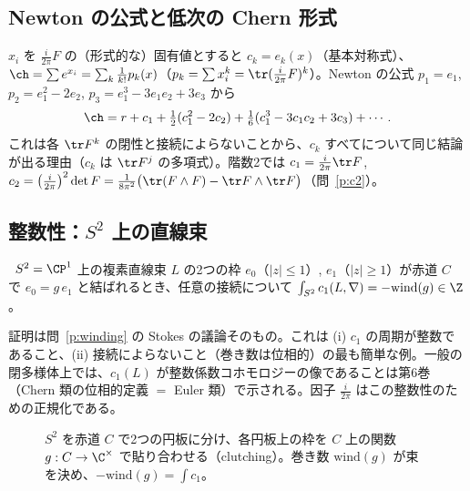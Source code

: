 \subsection{Newton の公式と低次の Chern 形式}
$x_i$ を $\frac i{2\pi}F$ の（形式的な）固有値とすると $c_k=e_k(x)$（基本対称式）、$\ch=\sum e^{x_i}=\sum_k\frac1{k!}p_k(x)$（$p_k=\sum x_i^k=\tr(\frac i{2\pi}F)^k$）。Newton の公式 $p_1=e_1$, $p_2=e_1^2-2e_2$, $p_3=e_1^3-3e_1e_2+3e_3$ から
\[
\ch=r+c_1+\tfrac12(c_1^2-2c_2)+\tfrac16(c_1^3-3c_1c_2+3c_3)+\cdots.
\]
これは各 $\tr F^k$ の閉性と接続によらないことから、$c_k$ すべてについて同じ結論が出る理由（$c_k$ は $\tr F^j$ の多項式）。階数2では $c_1=\frac i{2\pi}\tr F$, $c_2=\bigl(\frac i{2\pi}\bigr)^2\det F=\frac1{8\pi^2}\bigl(\tr(F\wedge F)-\tr F\wedge\tr F\bigr)$（問~\ref{p:c2}）。

\subsection{整数性：$S^2$ 上の直線束}
\begin{thm}\label{thm:integral}\tP\
$S^2=\CP^1$ 上の複素直線束 $L$ の2つの枠 $e_0$（$|z|\le1$）, $e_1$（$|z|\ge1$）が赤道 $C$ で $e_0=g\,e_1$ と結ばれるとき、任意の接続について $\int_{S^2}c_1(L,\nabla)=-\mathrm{wind}(g)\in\Z$。
\end{thm}
証明は問~\ref{p:winding} の Stokes の議論そのもの。これは (i) $c_1$ の周期が整数であること、(ii) 接続によらないこと（巻き数は位相的）の最も簡単な例。一般の閉多様体上では、$c_1(L)$ が整数係数コホモロジーの像であることは第6巻（Chern 類の位相的定義 $=$ Euler 類）で示される。因子 $\frac i{2\pi}$ はこの整数性のための正規化である。

\begin{figure}[h]
\centering
{}
\caption{$S^2$ を赤道 $C$ で2つの円板に分け、各円板上の枠を $C$ 上の関数 $g:C\to\C^\times$ で貼り合わせる（clutching）。巻き数 $\mathrm{wind}(g)$ が束を決め、$-\mathrm{wind}(g)=\int c_1$。}
\end{figure}

